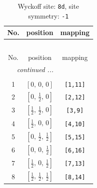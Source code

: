 \documentclass[fleqn,8pt]{jsarticle}
\begin{document}
\begin{longtable}{ccc}
\caption{Wyckoff site: {\tt 8d}, site symmetry: {\tt -1}}
 \\
 \hline \hline
No. & position & mapping \\ \hline \endfirsthead

\multicolumn{2}{l}{\tablename\ \thetable{}} \\
 \hline \hline
No. & position & mapping \\ \hline \endhead

 \hline \hline
\multicolumn{2}{r}{\footnotesize\it continued ...} \\ \endfoot

 \hline \hline
\multicolumn{2}{r}{} \\ \endlastfoot

1 & $\left[ 0,\, 0,\, 0 \right]$ & {\tt [1,11]} \\ \hline
2 & $\left[ 0,\, \frac{1}{2},\, 0 \right]$ & {\tt [2,12]} \\ \hline
3 & $\left[ \frac{1}{2},\, \frac{1}{2},\, 0 \right]$ & {\tt [3,9]} \\ \hline
4 & $\left[ \frac{1}{2},\, 0,\, 0 \right]$ & {\tt [4,10]} \\ \hline
5 & $\left[ 0,\, \frac{1}{2},\, \frac{1}{2} \right]$ & {\tt [5,15]} \\ \hline
6 & $\left[ 0,\, 0,\, \frac{1}{2} \right]$ & {\tt [6,16]} \\ \hline
7 & $\left[ \frac{1}{2},\, 0,\, \frac{1}{2} \right]$ & {\tt [7,13]} \\ \hline
8 & $\left[ \frac{1}{2},\, \frac{1}{2},\, \frac{1}{2} \right]$ & {\tt [8,14]} \\
\end{longtable}
\renewcommand{\arraystretch}{1.2}
\end{document}
